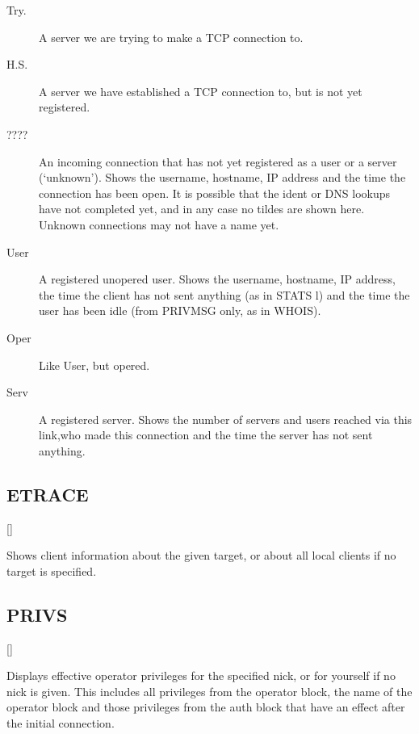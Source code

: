 \noindent
\begin{description}
\item[{Try.}]
	A server we are trying to make a TCP connection to.

\item[{H.S.}]
	A server we have established a TCP connection to, but is not
	yet registered.

\item[{????}]
	An incoming connection that has not yet registered as a user or a
	server (`unknown'). Shows the username, hostname, IP address and the
	time the connection has been open. It is possible that the ident or DNS
	lookups have not completed yet, and in any case no tildes are shown
	here. Unknown connections may not have a name yet.

\item[{User}]
	A registered unopered user. Shows the username, hostname, IP address,
	the time the client has not sent anything (as in STATS l) and the time
	the user has been idle (from PRIVMSG only, as in WHOIS).

\item[{Oper}]
	Like User, but opered.

\item[{Serv}]
	A registered server. Shows the number of servers and users reached via
	this link,who made this connection and the time the server has not sent
	anything.

\end{description}

\subsection{ETRACE}

    []

	Shows client information about the given target, or about all local
	clients if no target is specified.


\subsection{PRIVS}

    []

	Displays effective operator privileges for the specified nick, or for
	yourself if no nick is given. This includes all privileges from the
	operator block, the name of the operator block and those privileges
	from the auth block that have an effect after the initial connection.


